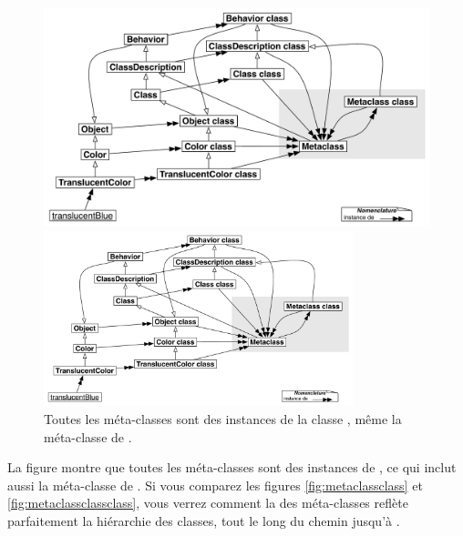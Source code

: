 \documentclass[a4paper,10pt,twoside]{book}
\begin{document}
\begin{center}
\begin{figure}
\ifluluelse
	{\centerline{\includegraphics[width=\textwidth]{TranslucentMetaclassClassClass}}}
	{\centerline{\includegraphics[width=0.8\textwidth]{TranslucentMetaclassClassClass}}}
\caption{Toutes les méta-classes sont des instances de la classe ,  même la méta-classe de . }
\end{figure}
\end{center}

La figure montre que toutes les méta-classes sont des instances de , ce qui inclut aussi la méta-classe de .
Si vous comparez les figures \ref{fig:metaclassclass} et \ref{fig:metaclassclassclass}, vous verrez comment la  des méta-classes reflète parfaitement la hiérarchie des classes, tout le long du chemin jusqu'à .
\end{document}
